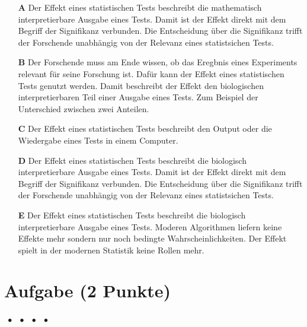 \documentclass[a4paper, 9pt]{scrartcl}\usepackage[]{graphicx}\usepackage[]{xcolor}
\begin{document}
\begin{enumerate}
\item [\textbf{A} \msquare] Der Effekt eines statistischen Tests beschreibt die mathematisch interpretierbare Ausgabe eines Tests. Damit ist der Effekt direkt mit dem Begriff der Signifikanz verbunden. Die Entscheidung über die Signifikanz trifft der Forschende unabhängig von der Relevanz eines statistsichen Tests.
\item [\textbf{B} \msquare] Der Forschende muss am Ende wissen, ob das Eregbnis eines Experiments relevant für seine Forschung ist. Dafür kann der Effekt eines statistischen Tests genutzt werden. Damit beschreibt der Effekt den biologischen interpretierbaren Teil einer Ausgabe eines Tests. Zum Beispiel der Unterschied zwischen zwei Anteilen.
\item [\textbf{C} \msquare] Der Effekt eines statistischen Tests beschreibt den Output oder die Wiedergabe eines Tests in einem Computer.
\item [\textbf{D} \msquare] Der Effekt eines statistischen Tests beschreibt die biologisch interpretierbare Ausgabe eines Tests. Damit ist der Effekt direkt mit dem Begriff der Signifikanz verbunden. Die Entscheidung über die Signifikanz trifft der Forschende unabhängig von der Relevanz eines statistsichen Tests.
\item [\textbf{E} \msquare] Der Effekt eines statistischen Tests beschreibt die biologisch interpretierbare Ausgabe eines Tests. Moderen Algorithmen liefern keine Effekte mehr sondern nur noch bedingte Wahrscheinlichkeiten. Der Effekt spielt in der modernen Statistik keine Rollen mehr.
\end{enumerate}

\section{Aufgabe \hfill (2 Punkte)}

\ifcollection
\begin{flushright}
\tiny\vspace{-2Ex}
\textbf{\examinhaltstart}
\exammodulemathstat $\;\bullet$
\exammodulestat $\;\bullet$
\exammodulestatbbv $\;\bullet$
\exammodulestatversuch $\;\bullet$
\exammodulebiostat
\vspace{-1Ex}
\end{flushright}
\fi
\end{document}
